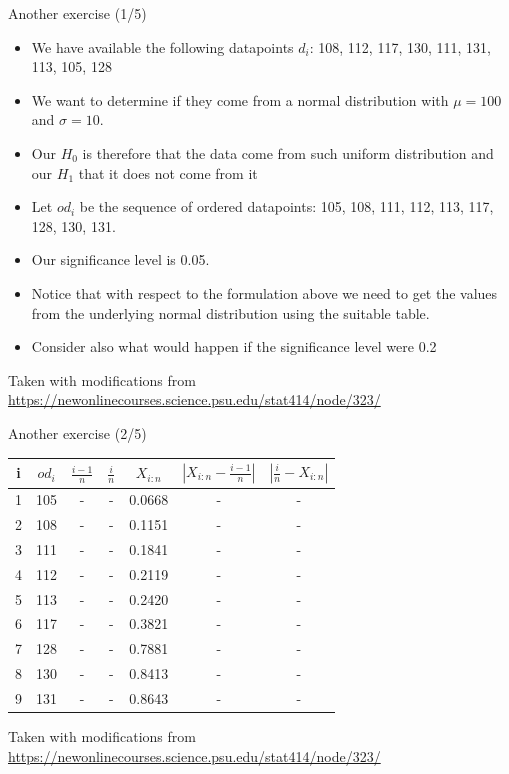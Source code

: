 \documentclass{beamer}
\begin{document}
\begin{frame}
{\centerline{Another exercise (1/5)}}

\begin{itemize}
   \item We have available the following datapoints $d_i$: 108, 112, 117, 130, 111, 131, 113, 105, 128
   \item We want to determine if they come from a normal distribution with $\mu = 100$ and $\sigma = 10$.
   \item Our $H_0$ is therefore that the data come from such uniform distribution and our $H_1$ that it does not come from it
   \item Let $od_i$ be the sequence of ordered datapoints: 105, 108, 111, 112, 113, 117, 128, 130, 131.
   \item Our significance level is 0.05.
   \item Notice that with respect to the formulation above we need to get the values from the underlying normal distribution using the suitable table.
   \item Consider also what would happen if the significance level were 0.2
\end{itemize}

\begin{center}
\tiny{Taken with modifications from \url{https://newonlinecourses.science.psu.edu/stat414/node/323/}}
\end{center}
\end{frame}



\begin{frame}
{\centerline{Another exercise (2/5)}}

\begin{center}
\begin{tabular}{|c|c|c|c|c|c|c|}
	\hline
	i & $od_i$ & $\frac{i-1}{n}$ & $\frac{i}{n}$ & $X_{i:n}$ & $|X_{i:n} - \frac{i-1}{n} |$ & $|\frac{i}{n} - X_{i:n}|$\\
	\hline
	1 & 105 & - & - & 0.0668 & - & -\\
	\hline
	2 & 108 & - & - & 0.1151 & - & -\\
	\hline
	3 & 111 & - & - & 0.1841 & - & -\\
	\hline
	4 & 112 & - & - & 0.2119 & - & -\\
	\hline
	5 & 113 & - & - & 0.2420 & - & -\\
	\hline
	6 & 117 & - & - & 0.3821 & - & -\\
	\hline
	7 & 128 & - & - & 0.7881 & - & -\\
	\hline
	8 & 130 & - & - & 0.8413 & - & -\\
	\hline
	9 & 131 & - & - & 0.8643 & - & -\\
	\hline
\end{tabular}
\end{center}

\begin{center}
\tiny{Taken with modifications from \url{https://newonlinecourses.science.psu.edu/stat414/node/323/}}
\end{center}
\end{frame}
\end{document}
